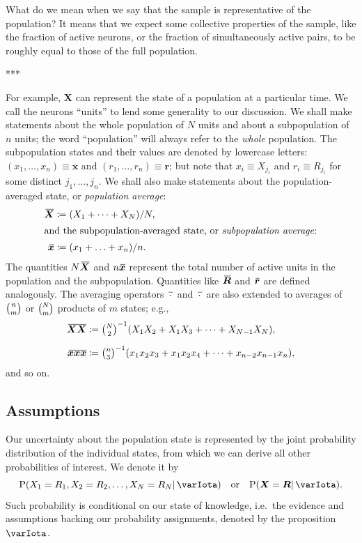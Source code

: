\documentclass{article}
\theoremstyle{remark}
\theoremstyle{innote}
\newcommand*{\defd}{\coloneqq}
\renewcommand*{\|}{\mathpunct{|}}%
\newcommand*{\dotv}{\mathord{\,\cdot\,}}%
\newcommand*{\p}{\mathrm{P}}%
\newcommand*{\ie}{{i.e.}}
\newcommand*{\eg}{{e.g.}}
\theoremstyle{simple}
\newcommand*{\widebar}[1]{{\mkern1.5mu\skew{2}\overline{\mkern-1.5mu#1\mkern-1.5mu}\mkern 1.5mu}}
\newcommand*{\av}{\widebar} %
\newcommand*{\sav}{\widebar} %
\newcommand*{\yxx}{x}%
\newcommand*{\yx}{\bm{\yxx}}%
\newcommand*{\yxs}{\sav{\yx}}%
\newcommand*{\yX}{\bm{X}}%
\newcommand*{\yXf}{\av{\yX}}%
\newcommand*{\yr}{\bm{r}}%
\newcommand*{\yrs}{\sav{\yr}}%
\newcommand*{\yR}{\bm{R}}%
\newcommand*{\yRf}{\av{\yR}}%
\newcommand*{\yH}{\varIota}
\begin{document}
What do we mean when we say that the sample is representative of the
population? It means that we expect some collective properties of the
sample, like the fraction of active neurons, or the fraction of
simultaneously active pairs, to be roughly equal to those of the full
population.

***

For example, $\yX$ can
represent the state of a population at a particular time. We call the
neurons \enquote{units} to lend some generality to our discussion. We shall
make statements about the whole population of $N$ units and about a
subpopulation of $n$ units; the word \enquote{population} will always refer
to the \emph{whole} population. The subpopulation states and their values
are denoted by lowercase letters: $(x_1, \dotsc, x_n)\equiv\yx$ and
$(r_1, \dotsc, r_n)\equiv\yr$; but note that $x_i \equiv X_{j_i}$ and
$r_i \equiv R_{j_i}$ for some distinct $j_1,\dotsc,j_n$. We shall also make
statements about the population-averaged state, or \emph{population
  average}:
\begin{align}
  \label{noeq:population-av}
   \yXf &\defd (X_1 + \dotsb + X_N)/N,
\\
\intertext{and the subpopulation-averaged state, or \emph{subpopulation average}:}
\label{noeq:subpopulation-av}
\yxs &\defd (x_1 + \dotsc + x_n)/n.
\end{align}
The quantities $N\yXf$ and $n\yxs$ represent the total number of active
units in the population and the subpopulation. Quantities like $\yRf$ and $\yrs$
are defined analogously. The averaging operators $\sav{\dotv}$ and
$\av{\dotv}$ are also extended to averages of $\tbinom{n}{m}$ or
$\tbinom{N}{m}$ products of $m$ states; \eg,
\begin{align}
\av{\yX \yX} &\defd
\tbinom{N}{2}^{-1} (X_1 X_2 + X_1 X_3  + \dotsb +  X_{N-1} X_N),
\\[2\jot]
\sav{\yx\yx\yx} &\defd
\tbinom{n}{3}^{-1} (x_1 x_2 x_3 + x_1 x_2 x_4 + \dotsb + x_{n-2} x_{n-1} x_n),
\end{align}
and so on.


\subsection{Assumptions}
\label{nosec:assumptions}

Our uncertainty about the population state is represented by the joint
probability distribution of the individual states, from which we can
derive all other probabilities of interest. We denote it by
\begin{equation}
  \label{noeq:joint_plaus}
  \p(X_1=R_1, X_2=R_2, \dotsc, X_N=R_N \| \yH) \quad\text{or}\quad
\p(\yX =\yR \| \yH).
\end{equation}
Such probability is conditional on our state of knowledge, \ie\ the
evidence and assumptions backing our probability assignments, denoted by
the proposition $\yH$.
\end{document}
